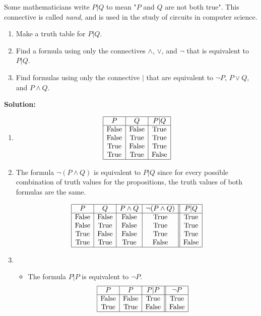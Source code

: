 Some mathematicians write $P | Q$ to mean "$P$ and $Q$ are not both true". This connective is called \textit{nand}, and is used in the study of circuits in computer science.
\begin{enumerate}[label=(\alph*)]
\item Make a truth table for $P | Q$.
\item Find a formula using only the connectives $\wedge$, $\vee$, and $\neg$ that is equivalent to $P | Q$.
\item Find formulas using only the connective $|$ that are equivalent to $\neg P$, $P \vee Q$, and $P \wedge Q$.
\end{enumerate}

\textbf{Solution:}
\begin{enumerate}[label=(\alph*)]
\item 
\[
\begin{array}{|c|c|c|}
\hline
P & Q & P | Q \\
\hline
\text{False} & \text{False} & \text{True} \\
\text{False} & \text{True} & \text{True} \\
\text{True} & \text{False} & \text{True} \\
\text{True} & \text{True} & \text{False} \\
\hline
\end{array}
\]

\item The formula $\neg (P \wedge Q)$ is equivalent to $P | Q$ since for every possible combination of truth values for the propositions, the truth values of both formulas are the same. 

\[
\begin{array}{|c|c|c|c||c|}
\hline
P & Q & P \wedge Q & \neg (P \wedge Q) & P | Q \\
\hline
\text{False} & \text{False} & \text{False} & \text{True} & \text{True} \\
\text{False} & \text{True} & \text{False} & \text{True} & \text{True} \\
\text{True} & \text{False} & \text{False} & \text{True} & \text{True} \\
\text{True} & \text{True} & \text{True} & \text{False} & \text{False} \\
\hline
\end{array}
\]

\pagebreak

\item \begin{itemize}
    \item The formula $P | P$ is equivalent to $\neg P$.
    \[
    \begin{array}{|c|c|c||c|}
    \hline
    P & P & P | P & \neg P \\
    \hline
    \text{False} & \text{False} & \text{True} & \text{True}\\
    \text{True} & \text{True} & \text{False} & \text{False} \\
    \hline
    \end{array}
    \]


\end{itemize}
\end{enumerate}
